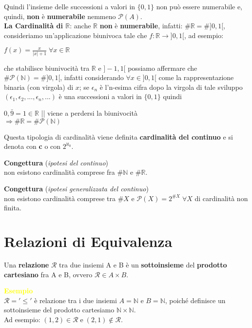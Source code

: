 Quindi l'insieme delle successioni a valori in $\{0, 1\}$  non può essere numerabile e, quindi, \textbf{non} è \textbf{numerabile} nemmeno $\mathcal{P}(A)$. \\ \newline
\textbf{La Cardinalità di $\mathbb{R}$}: anche $\mathbb{R}$ \textbf{non} è \textbf{numerabile}, infatti: $\#\mathbb{R} = \# ]0,1[$, consideriamo un'applicazione biunivoca tale che $f : \mathbb{R} \rightarrow ]0,1[$, ad esempio:
\begin{center}
    $f(x) = \frac{x}{ |x| + 1 } \; \forall x \in \mathbb{R}$
\end{center}
che stabilisce biunivocità tra $\mathbb{R}$ e $] -1, 1[$ possiamo affermare che $\#\mathcal{P}(\mathbb{N}) = \#]0,1[$, infatti considerando $\forall x \in ]0, 1[$ come la rappresentazione binaria (con virgola) di $x$; se $\epsilon_n$ è l'n-esima cifra dopo la virgola di tale sviluppo $(\epsilon_1, \epsilon_2, ..., \epsilon_n, ...)$ è una successioni a valori in $\{0, 1\}$ quindi
\begin{center}
    $0,\bar{9} = 1 \in \mathbb{R}$ || viene a perdersi la biunivocità \\
    $\Rightarrow \#\mathbb{R} = \# \mathcal{P}(\mathbb{N})$
\end{center}
Questa tipologia di cardinalità viene definita \textbf{cardinalità del continuo} e si denota con \textbf{c} o con $2^{\aleph_0}$.
\begin{boxA}
    \centering
    \textbf{Congettura} (\textit{ipotesi del continuo}) \\ 
    non esistono cardinalità comprese fra $\#\mathbb{N}$ e $\#\mathbb{R} $.
\end{boxA}
\begin{boxA}
    \centering
    \textbf{Congettura} (\textit{ipotesi generalizzata del continuo}) \\
    non esistono cardinalità comprese tra $\#X$ e $\mathcal{P}(X) = 2^{\#X} \; \forall X$ di cardinalità non finita.
\end{boxA}

\newpage
\section{Relazioni di Equivalenza}
Una \textbf{relazione} $\mathcal{R}$ tra due insiemi A e B è un \textbf{sottoinsieme} del \textbf{prodotto cartesiano} fra A e B, ovvero $\mathcal{R} \in A \times B$.
\begin{boxA}
    \textcolor{yellow}{\textbf{Esempio}} \\
    $\mathcal{R} = '\leq'$ è relazione tra i due insiemi $A = \mathbb{N}$ e $B = \mathbb{N}$, poiché definisce un sottoinsieme del prodotto cartesiamo $\mathbb{N} \times \mathbb{N}$. \\
    Ad esempio: $(1, 2) \in \mathcal{R} \; \text{e} \; (2, 1) \notin \mathcal{R}$.
\end{boxA}

